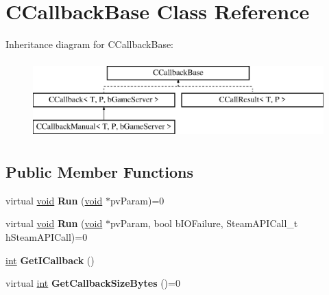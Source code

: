 \hypertarget{classCCallbackBase}{}\section{C\+Callback\+Base Class Reference}
\label{classCCallbackBase}
Inheritance diagram for C\+Callback\+Base\+:\begin{figure}[H]
\begin{center}
\leavevmode
\includegraphics[height=3.000000cm]{classCCallbackBase}
\end{center}
\end{figure}
\subsection*{Public Member Functions}
\begin{DoxyCompactItemize}
\item 
\hypertarget{classCCallbackBase_a8ec1dcecacbf12f0cade541d7c736cec}{}virtual \hyperlink{SDL__audio_8h_a52835ae37c4bb905b903cbaf5d04b05f}{void} {\bfseries Run} (\hyperlink{SDL__audio_8h_a52835ae37c4bb905b903cbaf5d04b05f}{void} $\ast$pv\+Param)=0\label{classCCallbackBase_a8ec1dcecacbf12f0cade541d7c736cec}

\item 
\hypertarget{classCCallbackBase_a958087c4f7ba0004bdf7b668e9ef7f51}{}virtual \hyperlink{SDL__audio_8h_a52835ae37c4bb905b903cbaf5d04b05f}{void} {\bfseries Run} (\hyperlink{SDL__audio_8h_a52835ae37c4bb905b903cbaf5d04b05f}{void} $\ast$pv\+Param, bool b\+I\+O\+Failure, Steam\+A\+P\+I\+Call\+\_\+t h\+Steam\+A\+P\+I\+Call)=0\label{classCCallbackBase_a958087c4f7ba0004bdf7b668e9ef7f51}

\item 
\hypertarget{classCCallbackBase_af6c3c5a7214deea9da66983f94b7b31b}{}\hyperlink{SDL__thread_8h_a6a64f9be4433e4de6e2f2f548cf3c08e}{int} {\bfseries Get\+I\+Callback} ()\label{classCCallbackBase_af6c3c5a7214deea9da66983f94b7b31b}

\item 
\hypertarget{classCCallbackBase_afcf6da82f51fb962330f3b5d61c618d8}{}virtual \hyperlink{SDL__thread_8h_a6a64f9be4433e4de6e2f2f548cf3c08e}{int} {\bfseries Get\+Callback\+Size\+Bytes} ()=0\label{classCCallbackBase_afcf6da82f51fb962330f3b5d61c618d8}

\end{DoxyCompactItemize}
